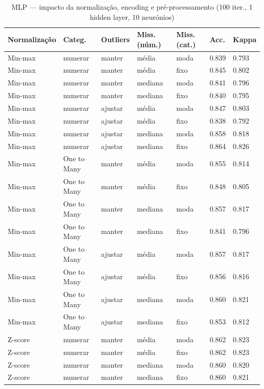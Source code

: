 \documentclass[11pt,a4paper]{article}
\begin{document}
\begin{table}[H]
    \centering
    \scriptsize
    \setlength{\tabcolsep}{4pt}
    \caption{MLP --- impacto da normalização, encoding e pré-processamento (100 iter., 1 hidden layer, 10 neurónios)}
    \label{tab:mlp_preprocessamento}
    \begin{tabular}{L{2.2cm}L{2cm}L{1.5cm}L{1.7cm}L{2cm}L{1.2cm}L{1.5cm}}
    \toprule
    Normalização & Categ. & Outliers & Miss. (núm.) & Miss. (cat.) & Acc. & Kappa \\
    \midrule
    Min-max & numerar & manter & média & moda & 0.839 & 0.793 \\
    Min-max & numerar & manter & média & fixo & 0.845 & 0.802 \\
    Min-max & numerar & manter & mediana & moda & 0.841 & 0.796 \\
    Min-max & numerar & manter & mediana & fixo & 0.840 & 0.795 \\
    Min-max & numerar & ajustar & média & moda & 0.847 & 0.803 \\
    Min-max & numerar & ajustar & média & fixo & 0.838 & 0.792 \\
    Min-max & numerar & ajustar & mediana & moda & 0.858 & 0.818 \\
    Min-max & numerar & ajustar & mediana & fixo & 0.864 & 0.826 \\
    Min-max & One to Many & manter & média & moda & 0.855 & 0.814 \\
    Min-max & One to Many & manter & média & fixo & 0.848 & 0.805 \\
    Min-max & One to Many & manter & mediana & moda & 0.857 & 0.817 \\
    Min-max & One to Many & manter & mediana & fixo & 0.841 & 0.796 \\
    Min-max & One to Many & ajustar & média & moda & 0.857 & 0.817 \\
    Min-max & One to Many & ajustar & média & fixo & 0.856 & 0.816 \\
    Min-max & One to Many & ajustar & mediana & moda & 0.860 & 0.821 \\
    Min-max & One to Many & ajustar & mediana & fixo & 0.853 & 0.812 \\
    Z-score & numerar & manter & média & moda & 0.862 & 0.823 \\
    Z-score & numerar & manter & média & fixo & 0.862 & 0.823 \\
    Z-score & numerar & manter & mediana & moda & 0.860 & 0.820 \\
    Z-score & numerar & manter & mediana & fixo & 0.860 & 0.821 \\

\end{tabular}
\end{table}
\end{document}
